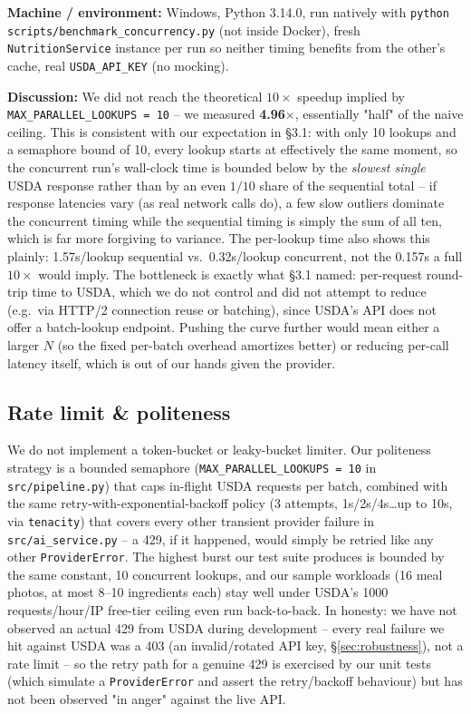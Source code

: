 \documentclass[11pt,a4paper]{article}
\begin{document}
\textbf{Machine / environment:} Windows, Python 3.14.0, run natively with \texttt{python scripts/benchmark\_concurrency.py} (not inside Docker), fresh \texttt{NutritionService} instance per run so neither timing benefits from the other's cache, real \texttt{USDA\_API\_KEY} (no mocking).

\textbf{Discussion:} We did not reach the theoretical $10\times$ speedup implied by \texttt{MAX\_PARALLEL\_LOOKUPS = 10} -- we measured \textbf{4.96$\times$}, essentially "half" of the naive ceiling. This is consistent with our expectation in \S3.1: with only 10 lookups and a semaphore bound of 10, every lookup starts at effectively the same moment, so the concurrent run's wall-clock time is bounded below by the \emph{slowest single} USDA response rather than by an even $1/10$ share of the sequential total -- if response latencies vary (as real network calls do), a few slow outliers dominate the concurrent timing while the sequential timing is simply the sum of all ten, which is far more forgiving to variance. The per-lookup time also shows this plainly: 1.57s/lookup sequential vs.\ 0.32s/lookup concurrent, not the 0.157s a full $10\times$ would imply. The bottleneck is exactly what \S3.1 named: per-request round-trip time to USDA, which we do not control and did not attempt to reduce (e.g.\ via HTTP/2 connection reuse or batching), since USDA's API does not offer a batch-lookup endpoint. Pushing the curve further would mean either a larger $N$ (so the fixed per-batch overhead amortizes better) or reducing per-call latency itself, which is out of our hands given the provider.

\subsection{Rate limit \& politeness}

We do not implement a token-bucket or leaky-bucket limiter. Our politeness strategy is a bounded semaphore (\texttt{MAX\_PARALLEL\_LOOKUPS = 10} in \texttt{src/pipeline.py}) that caps in-flight USDA requests per batch, combined with the same retry-with-exponential-backoff policy (3 attempts, 1s/2s/4s\ldots up to 10s, via \texttt{tenacity}) that covers every other transient provider failure in \texttt{src/ai\_service.py} -- a 429, if it happened, would simply be retried like any other \texttt{ProviderError}. The highest burst our test suite produces is bounded by the same constant, 10 concurrent lookups, and our sample workloads (16 meal photos, at most 8--10 ingredients each) stay well under USDA's 1000 requests/hour/IP free-tier ceiling even run back-to-back. In honesty: we have not observed an actual 429 from USDA during development -- every real failure we hit against USDA was a 403 (an invalid/rotated API key, \S\ref{sec:robustness}), not a rate limit -- so the retry path for a genuine 429 is exercised by our unit tests (which simulate a \texttt{ProviderError} and assert the retry/backoff behaviour) but has not been observed "in anger" against the live API.
\end{document}
